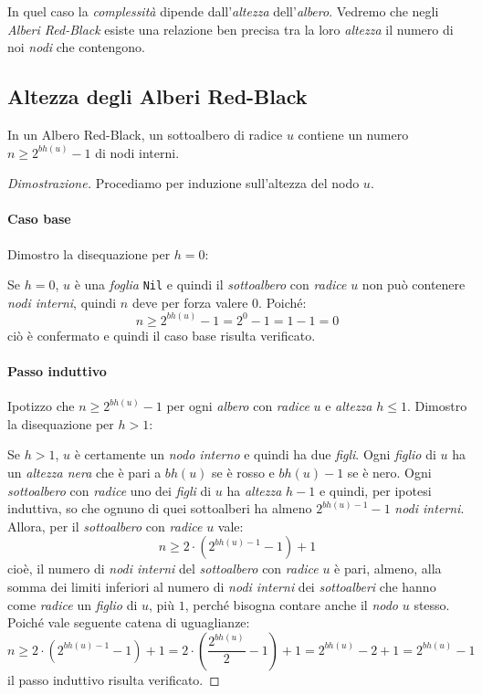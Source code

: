 In quel caso la \emph{complessità} dipende dall'\emph{altezza} dell'\emph{albero}.
Vedremo che negli \emph{Alberi Red-Black} esiste una relazione ben precisa tra
la loro \emph{altezza} il numero di noi \emph{nodi} che contengono.
\newpage
\subsection{Altezza degli Alberi Red-Black}
\begin{definition}
    In un Albero Red-Black, un sottoalbero di radice $u$ contiene un numero
    $n\geq 2^{bh(u)}-1$ di nodi interni.
\end{definition}
\begin{proof}[Dimostrazione]
    Procediamo per induzione sull'altezza del nodo $u$.
    \paragraph{Caso base} Dimostro la disequazione per $h=0$:

    Se $h=0$, $u$ è una \emph{foglia} \texttt{Nil} e quindi il \emph{sottoalbero}
    con \emph{radice} $u$ non può contenere \emph{nodi interni}, quindi $n$ deve
    per forza valere $0$. Poiché:
    \[n\geq2^{bh(u)}-1=2^0-1=1-1=0\]
    ciò è confermato e quindi il caso base risulta verificato.

    \paragraph{Passo induttivo} Ipotizzo che $n\geq2^{bh(u)}-1$ per ogni
    \emph{albero} con \emph{radice} $u$ e \emph{altezza} $h\leq1$. Dimostro la
    disequazione per $h>1$:

    Se $h>1$, $u$ è certamente un \emph{nodo interno} e quindi ha due \emph{figli}.
    Ogni \emph{figlio} di $u$ ha un \emph{altezza nera} che è pari a $bh(u)$ se
    è rosso e $bh(u)-1$ se è nero. Ogni \emph{sottoalbero} con \emph{radice} uno
    dei \emph{figli} di $u$ ha \emph{altezza} $h-1$ e quindi, per ipotesi induttiva,
    so che ognuno di quei sottoalberi ha almeno $2^{bh(u)-1}-1$ \emph{nodi interni}.
    Allora, per il \emph{sottoalbero} con \emph{radice} $u$ vale:
    \[n\geq2\cdot\left(2^{bh(u)-1}-1\right)+1\]
    cioè, il numero di \emph{nodi interni} del \emph{sottoalbero} con \emph{radice}
    $u$ è pari, almeno, alla somma dei limiti inferiori al numero di \emph{nodi
    interni} dei \emph{sottoalberi} che hanno come \emph{radice} un \emph{figlio}
    di $u$, più $1$, perché bisogna contare anche il \emph{nodo} $u$ stesso.
    Poiché vale seguente catena di uguaglianze:
    \[n\geq2\cdot\left(2^{bh(u)-1}-1\right)+1=2\cdot\left(\frac{2^{bh(u)}}{2}-1
    \right)+1=2^{bh(u)}-2+1=2^{bh(u)}-1\]
    il passo induttivo risulta verificato.
\end{proof}

